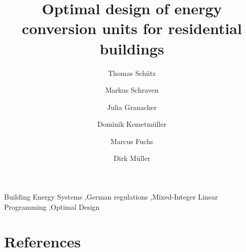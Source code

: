 \documentclass[review]{elsarticle}
\begin{document}
\begin{frontmatter}

\title{Optimal design of energy conversion units for residential buildings}

\author{Thomas Sch\"utz}

\author{Markus Schraven}
\author{Julia Granacher}
\author{Dominik Kemetm\"uller}
\author{Marcus Fuchs}
\author{Dirk M\"uller}

\address{RWTH Aachen University, E.ON Energy Research Center, Institute for Energy Efficient Buildings and Indoor Climate, Mathieustr. 10, Aachen, Germany}

\begin{abstract}
%
\end{abstract}

\begin{keyword}
Building Energy Systems \sep German regulations \sep Mixed-Integer Linear Programming \sep Optimal Design
\end{keyword}

\end{frontmatter}


%





%

\appendix

%

\section*{References}

 

\end{document}
